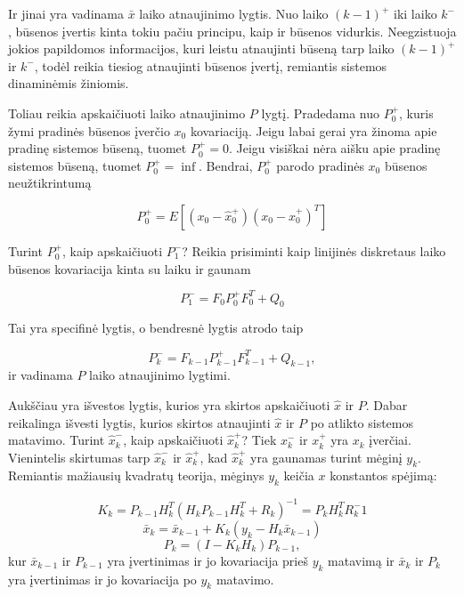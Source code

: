 \documentclass[12pt, a4paper, lithuanian]{article}
\begin{document}
        Ir jinai yra vadinama $\bar{x}$ laiko atnaujinimo lygtis.
        Nuo laiko $(k-1)^+$ iki laiko $k^-$, būsenos įvertis kinta tokiu pačiu principu, kaip ir būsenos vidurkis.
        Neegzistuoja jokios papildomos informacijos, kuri leistu atnaujinti būseną tarp laiko $(k-1)^+$ ir $k^-$, todėl reikia tiesiog atnaujinti būsenos įvertį, remiantis sistemos dinaminėmis žiniomis.

        Toliau reikia apskaičiuoti laiko atnaujinimo $P$ lygtį.
        Pradedama nuo $P_0^+$, kuris žymi pradinės būsenos įverčio $x_0$ kovariaciją.
        Jeigu labai gerai yra žinoma apie pradinę sistemos būseną, tuomet $P_0^+ = 0$.
        Jeigu visiškai nėra aišku apie pradinę sistemos būseną, tuomet $P_0^+ = \inf$.
        Bendrai, $P_0^+$ parodo pradinės $x_0$ būsenos neužtikrintumą

        \begin{equation}
            P_0^+ = E[(x_0 - \hat{x}_0^+)(x_0 - \hat{x}_0^+)^T]
        \end{equation}

        Turint $P_0^+$, kaip apskaičiuoti $P_1^-$? Reikia prisiminti kaip linijinės diskretaus laiko būsenos kovariacija kinta su laiku ir gaunam

        \begin{equation}
            P_1^- = F_0 P_0^+F_0^T + Q_0
        \end{equation}

        Tai yra specifinė lygtis, o bendresnė lygtis atrodo taip

        \begin{equation}
            P_k^- = F_{k-1}P_{k-1}^+F_{k-1}^T + Q_{k-1},
        \end{equation}
        ir vadinama $P$ laiko atnaujinimo lygtimi.

        Aukščiau yra išvestos lygtis, kurios yra skirtos apskaičiuoti $\hat{x}$ ir $P$.
        Dabar reikalinga išvesti lygtis, kurios skirtos atnaujinti $\hat{x}$ ir $P$ po atlikto sistemos matavimo.
        Turint $\hat{x}_k^-$, kaip apskaičiuoti $\hat{x}_k^+$? Tiek $x_k^-$ ir $x_k^+$ yra $x_k$ įverčiai.
        Vienintelis skirtumas tarp $\hat{x}_k^-$ ir $\hat{x}_k^+$, kad $\hat{x}_k^+$ yra gaunamas turint mėginį $y_k$.
        Remiantis mažiausių kvadratų teorija, mėginys $y_k$ keičia $x$ konstantos spėjimą:

        \begin{equation}
            K_k = P_{k-1}H_k^T(H_kP_{k-1}H_k^T + R_k)^{-1} = P_kH_k^TR_k^-1
        \end{equation}
        \begin{equation}
            \bar{x}_k = \bar{x}_{k-1} + K_k(y_k - H_k\bar{x}_{k-1})
        \end{equation}
        \begin{equation}
            P_k = (I - K_kH_k)P_{k-1},
        \end{equation}
        kur $\bar{x}_{k-1}$ ir $P_{k-1}$ yra įvertinimas ir jo kovariacija prieš $y_k$ matavimą ir $\bar{x}_k$ ir $P_k$ yra įvertinimas ir jo kovariacija po $y_k$ matavimo.
\end{document}
